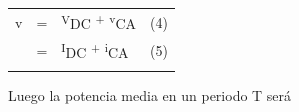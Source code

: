 \documentclass[12pt]{article}
\begin{document}
\vspace{\baselineskip}




\begin{table}[H]
 			\centering
\begin{tabular}{p{-0.06in}p{0.05in}p{1.36in}p{0.8in}}
\multicolumn{1}{p{-0.06in}}{v} & 
\multicolumn{1}{p{0.05in}}{=} & 
\multicolumn{1}{p{1.36in}}{\textsuperscript{V}{\fontsize{7pt}{8.4pt}\selectfont DC \textsuperscript{+} \textsuperscript{v}CA}} & 
\multicolumn{1}{p{0.8in}}{(4)} \\
\hhline{~~~~}
\multicolumn{1}{p{-0.06in}}{i} & 
\multicolumn{1}{p{0.05in}}{=} & 
\multicolumn{1}{p{1.36in}}{\textsuperscript{I}{\fontsize{7pt}{8.4pt}\selectfont DC \textsuperscript{+} \textsuperscript{i}CA}} & 
\multicolumn{1}{p{0.8in}}{(5)} \\
\hhline{~~~~}

\end{tabular}
 \end{table}



\begin{adjustwidth}{1.07in}{0.0in}
Luego la potencia media en un periodo T será\par

\end{adjustwidth}


\vspace{\baselineskip}


\end{document}
